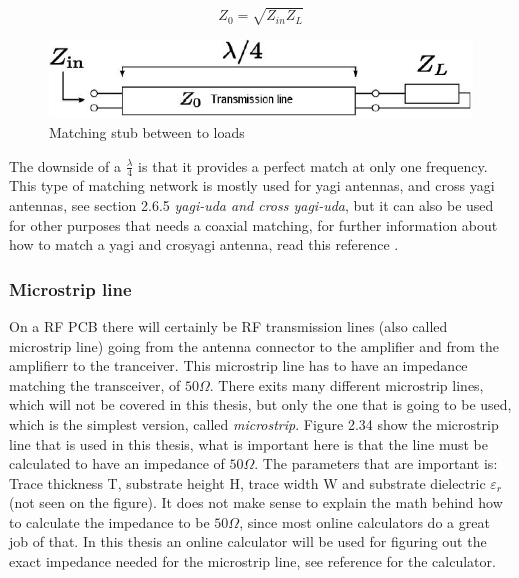 \begin{equation}
   Z_0 = \sqrt{Z_{in}Z_{L}}
\end{equation}

\begin{figure}[h]
\centering
\includegraphics[scale=0.7]{figures/TransmissionLine.PNG}
\caption{Matching stub between to loads}
\end{figure}

The downside of a $\frac{\lambda}{4}$ is that it provides a perfect match at only one frequency. This type of matching network is mostly used for yagi antennas, and cross yagi antennas, see section 2.6.5 \textit{yagi-uda and cross yagi-uda}, but it can also be used for other purposes that needs a coaxial matching, for further information about how to match a yagi and crosyagi antenna, read this reference \cite{YagiMatching}. 

\subsubsection{Microstrip line}
On a RF PCB there will certainly be RF transmission lines (also called microstrip line) going from the antenna connector to the amplifier and from the amplifierr to the tranceiver. This microstrip line has to have an impedance matching the transceiver, of $50\Omega$. There exits many different microstrip lines, which will not be covered in this thesis, but only the one that is going to be used, which is the simplest version, called \textit{microstrip}. Figure 2.34 show the microstrip line that is used in this thesis, what is important here is that the line must be calculated to have an impedance of $50\Omega$. The parameters that are important is: Trace thickness T, substrate height H, trace width W and substrate dielectric $\varepsilon_r$ (not seen on the figure). It does not make sense to explain the math behind how to calculate the impedance to be $50\Omega$, since most online calculators do a great job of that. In this thesis an online calculator will be used for figuring out the exact impedance needed for the microstrip line, see reference for the calculator\cite{MicrostripCalcu}. 

